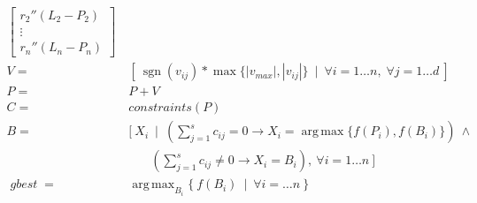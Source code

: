 \documentclass[10pt,draft]{article}
\DeclareMathOperator*{\argmax}{arg\,max}
\DeclareMathOperator*{\sgn}{sgn}
\DeclareMathOperator*{\gbest}{\mathit{gbest}}
\begin{document}
\begin{appendices}
\begin{align}
\begin{bmatrix}
      {r_2}''(L_2 - P_2)\\
      \vdots\\
      {r_n}''(L_n - P_n)
    \end{bmatrix}\\
    V  =&\ \left[\ \sgn(v_{ij})*\max\{|v_{max}|,|v_{ij}|\}\ \mid\ \forall i=1\dots n,\;\forall j=1\dots d\ \right]\\
    P  =&\ P + V\\
    C  =&\ \mathit{constraints}(P)\\
    B  =&\ [\ X_i\ \mid\ (\textstyle\sum_{j=1}^s c_{ij} = 0 \to X_i = \argmax\{f(P_i), f(B_i)\})\ \wedge\\
        &\qquad(\textstyle\sum_{j=1}^s c_{ij} \neq 0 \to X_i = B_i),\ \forall i=1\dots n\ ]\\
    \gbest =&\ \argmax_{{B}_i} \{\ {f(B_i)}\ \mid\ \forall i=\dots n\ \}
  \end{align}

\end{appendices}
\end{document}
